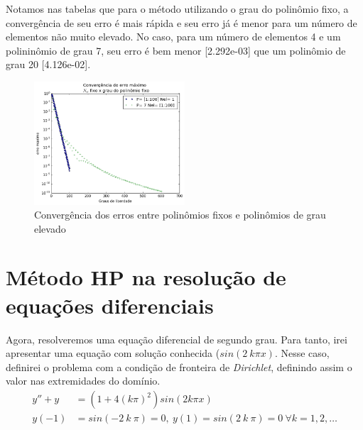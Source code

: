  Notamos nas tabelas  que para o método utilizando o grau do polinômio fixo, a convergência de seu erro é mais rápida  e seu erro já é menor para um número de elementos não muito elevado. No caso, para um número de elementos 4 e um polininômio de grau 7, seu erro é bem menor [2.292e-03] que um polinômio de grau 20 [4.126e-02].

\begin{figure}[!hb]
  \includegraphics[width=0.5\textwidth,center]{figuras/convergencia_erro_FEM2.png}
  \caption{Convergência dos erros entre polinômios fixos e polinômios de grau elevado}
\end{figure}

\section{Método HP na resolução de equações diferenciais}

 Agora, resolveremos uma equação diferencial de segundo grau. Para tanto, irei apresentar uma equação com solução conhecida ($sin(2\ k \pi x)$. Nesse caso, definirei o problema com a condição de fronteira de \emph{Dirichlet}, definindo assim o valor nas extremidades do domínio.
\begin{align}
y'' + y &= (1 + 4 (k \pi)^2)sin(2 k \pi x) \\
y(-1) &= sin(-2\ k \ \pi ) = 0 ,\ y(1) = sin(2\ k\ \pi) = 0 \ \forall k = 1,2,\dots \\
\end{align}

